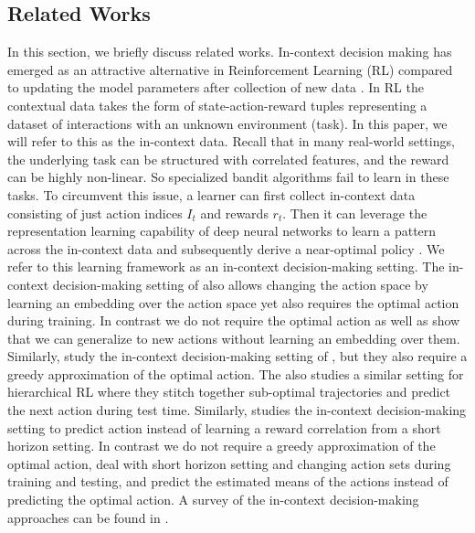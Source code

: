 \documentclass[10pt]{article}
\theoremstyle{plain}
\theoremstyle{definition}
\theoremstyle{remark}
\begin{document}
\subsection{Related Works}
\label{sec:related}
In this section, we briefly discuss related works.
In-context decision making \citep{laskin2022context,lee2023supervised} has emerged as an attractive alternative in Reinforcement Learning (RL) compared to updating the model parameters after collection of new data \citep{mnih2013playing, franccois2018introduction}.
In RL the contextual data takes the form
of state-action-reward tuples representing a dataset of interactions with an unknown environment (task). In this paper, we will refer to this as the in-context data.
Recall that in many real-world settings, the underlying task can be structured with correlated features, and the reward can be highly non-linear. So specialized bandit algorithms fail to learn in these tasks.
To circumvent this issue, a learner can first collect in-context data consisting of just action indices $I_t$ and rewards $r_t$. Then it can leverage the representation learning capability of deep neural networks to learn a pattern across the in-context data and subsequently derive a near-optimal policy \citep{lee2023supervised, mirchandani2023large}. We refer to this learning framework as an in-context decision-making setting.
The in-context decision-making setting of \citet{sinii2023context} also allows changing the action space by learning an embedding over the action space yet also requires the optimal action during training. In contrast we do not require the optimal action as well as show that we can generalize to new actions without learning an embedding over them. Similarly, \citet{lin2023transformers} study the in-context decision-making setting of \citet{laskin2022context, lee2023supervised}, but they also require a greedy approximation of the optimal action. The \citet{ma2023rethinking} also studies a similar setting for hierarchical RL where they stitch together sub-optimal trajectories and predict the next action during test time. Similarly, \citet{liu2023reason} studies the in-context decision-making setting to predict action instead of learning a reward correlation from a short horizon setting.
In contrast we do not require a greedy approximation of the optimal action, deal with short horizon setting and changing action sets during training and testing, and predict the estimated means of the actions instead of predicting the optimal action.
A survey of the in-context decision-making approaches can be found in \citet{liu2023self}.
\end{document}
